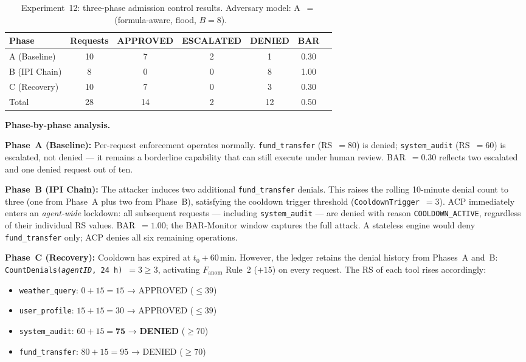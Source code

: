 \documentclass[11pt]{article}
\theoremstyle{definition}
\begin{document}
\begin{table}[h!]
\centering\small
\caption{Experiment~12: three-phase admission control results.
Adversary model: A~$=$~(formula-aware, flood, $B{=}8$).}
\label{tab:exp12-results}
\begin{tabular}{@{}lcccccc@{}}
\toprule
Phase & Requests & APPROVED & ESCALATED & DENIED & BAR \\
\midrule
A (Baseline)   & 10 &  7 & 2 &  1 & 0.30 \\
B (IPI Chain)  &  8 &  0 & 0 &  8 & 1.00 \\
C (Recovery)   & 10 &  7 & 0 &  3 & 0.30 \\
\midrule
Total          & 28 & 14 & 2 & 12 & 0.50 \\
\bottomrule
\end{tabular}
\end{table}

\textbf{Phase-by-phase analysis.}

\textbf{Phase~A (Baseline):}
Per-request enforcement operates normally.
\texttt{fund\_transfer} (RS~$=80$) is denied; \texttt{system\_audit}
(RS~$=60$) is escalated, not denied --- it remains a borderline capability
that can still execute under human review.
BAR~$=0.30$ reflects two escalated and one denied request out of ten.

\textbf{Phase~B (IPI Chain):}
The attacker induces two additional \texttt{fund\_transfer} denials.
This raises the rolling 10-minute denial count to three
(one from Phase~A plus two from Phase~B),
satisfying the cooldown trigger threshold (\texttt{CooldownTrigger}~$=3$).
ACP immediately enters an \emph{agent-wide} lockdown:
all subsequent requests --- including \texttt{system\_audit} --- are denied
with reason \texttt{COOLDOWN\_ACTIVE}, regardless of their individual RS values.
BAR~$=1.00$; the BAR-Monitor window captures the full attack.
A stateless engine would deny \texttt{fund\_transfer} only;
ACP denies all six remaining operations.

\textbf{Phase~C (Recovery):}
Cooldown has expired at $t_0 + 60\,\mathrm{min}$.
However, the ledger retains the denial history from Phases~A and~B:
\texttt{CountDenials(\textit{agentID}, 24\,h)}~$= 3 \geq 3$,
activating $F_\text{anom}$ Rule~2 ($+15$) on every request.
The RS of each tool rises accordingly:

\begin{itemize}[noitemsep]
  \item \texttt{weather\_query}: $0 + 15 = 15$ → APPROVED ($\leq 39$)
  \item \texttt{user\_profile}: $15 + 15 = 30$ → APPROVED ($\leq 39$)
  \item \texttt{system\_audit}: $60 + 15 = \mathbf{75}$ → \textbf{DENIED} ($\geq 70$)
  \item \texttt{fund\_transfer}: $80 + 15 = 95$ → DENIED ($\geq 70$)
\end{itemize}
\end{document}
